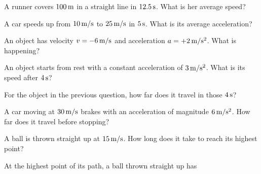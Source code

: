 \begin{exo}{}
A runner covers $100\,\mathrm{m}$ in a straight line in $12.5\,\mathrm{s}$. What is her average speed?
\choices{$12.5\ms$}{$80\ms$}{$0.125\ms$}{$8\ms$}
\end{exo}
\begin{exo}{}
A car speeds up from $10\,\mathrm{m/s}$ to $25\,\mathrm{m/s}$ in $5\,\mathrm{s}$. What is its average acceleration?
\choices{$2\mss$}{$5\mss$}{$3\mss$}{$7\mss$}
\end{exo}
\begin{exo}{}
An object has velocity $v=-6\,\mathrm{m/s}$ and acceleration $a=+2\,\mathrm{m/s^2}$. What is happening?
\end{exo}
\begin{exo}{}
An object starts from rest with a constant acceleration of $3\mss$. What is its speed after $4\,\mathrm{s}$?
\choices{$7\ms$}{$12\ms$}{$24\ms$}{$0.75\ms$}
\end{exo}
\begin{exo}{}
For the object in the previous question, how far does it travel in those $4\,\mathrm{s}$?
\choices{$12\m$}{$48\m$}{$24\m$}{$6\m$}
\end{exo}
\begin{exo}{}
A car moving at $30\,\mathrm{m/s}$ brakes with an acceleration of magnitude $6\,\mathrm{m/s^2}$. How far does it travel before stopping?
\choices{$75\m$}{$150\m$}{$5\m$}{$90\m$}
\end{exo}
\begin{exo}{}
A ball is thrown straight up at $15\,\mathrm{m/s}$. How long does it take to reach its highest point?
\choices{$3\s$}{$0.67\s$}{$1.5\s$}{$15\s$}
\end{exo}
\begin{exo}{}
At the highest point of its path, a ball thrown straight up has
\end{exo}
